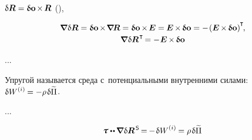 \begin{otherlanguage}{russian}
 ${\updelta\hspace{-0.1ex}\bm{R} = \bm{\updelta}\hspace{-0.125ex}\bm{\mathrm{o}} \hspace{-0.2ex} \times \hspace{-0.2ex} \bm{R}}$ (), 

\nopagebreak\vspace{-0.2em}\begin{equation*}
\begin{array}{c}
\boldnabla \hspace{.1ex} \variation{\bm{R}}
= \varvector{o} \hspace{-0.2ex} \times \hspace{-0.32ex} \boldnabla \hspace{-0.2ex} \bm{R}
= \varvector{o} \hspace{-0.16ex} \times \hspace{-0.24ex} \bm{E}
= \hspace{-0.1ex} \bm{E} \hspace{-0.16ex} \times \hspace{-0.2ex} \varvector{o}
= - \hspace{-0.2ex} \left( \bm{E} \hspace{-0.16ex} \times \hspace{-0.2ex} \varvector{o} \right)^{\hspace{-0.1ex}\T} \hspace{-0.64ex} ,
\\[.25em]
%
\boldnabla \hspace{.1ex} \variation{\bm{R}}^{\hspace{.16ex}\T} \hspace{-0.25ex}
= - \hspace{.1ex} \bm{E} \hspace{-0.16ex} \times \hspace{-0.2ex} \varvector{o}
\end{array}
\end{equation*}


...



Упругой называется среда с~потенциальными внутренними силами: ${\variation{\internalwork} = - \rho \hspace{.2ex} \variation{\widetilde{\Pi}}}$.

...

\begin{equation}
\cauchystress \dotdotp \hspace{-0.12ex} \boldnabla \hspace{.1ex} \variation{\bm{R}}^{\hspace{0.25ex}\mathsf{S}} \hspace{-0.25ex}
= \hspace{-0.2ex} - \hspace{.2ex} \variation{\internalwork}
= \rho \hspace{.2ex} \variation{\widetilde{\Pi}}
\end{equation}


\end{otherlanguage}
